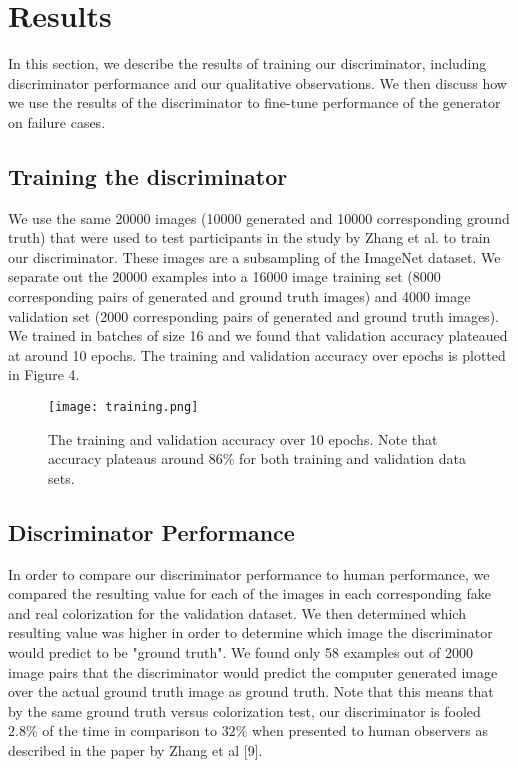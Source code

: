 \documentclass[10pt,twocolumn,letterpaper]{article}
\begin{document}
\section{Results}

In this section, we describe the results of training our discriminator, including discriminator performance and our qualitative observations. We then discuss how we use the results of the discriminator to fine-tune performance of the generator on failure cases. 

\subsection{Training the discriminator}

We use the same 20000 images (10000 generated and 10000 corresponding ground truth) that were used to test participants in the study by Zhang et al. to train our discriminator. These images are a subsampling of the ImageNet dataset. We separate out the 20000 examples into a 16000 image training set (8000 corresponding pairs of generated and ground truth images) and 4000 image validation set (2000 corresponding pairs of generated and ground truth images). We trained in batches of size 16 and we found that validation accuracy plateaued at around 10 epochs. The training and validation accuracy over epochs is plotted in Figure 4. 

\begin{figure}[htp]

\centering
\texttt{[image: training.png]} 
\caption{The training and validation accuracy over 10 epochs. Note that accuracy plateaus around $86\%$ for both training and validation data sets.}

\end{figure}

\subsection{Discriminator Performance}

In order to compare our discriminator performance to human performance, we compared the resulting value for each of the images in each corresponding fake and real colorization for the validation dataset. We then determined which resulting value was higher in order to determine which image the discriminator would predict to be "ground truth". We found only 58 examples out of 2000 image pairs that the discriminator would predict the computer generated image over the actual ground truth image as ground truth. Note that this means that by the same ground truth versus colorization test, our discriminator is fooled $2.8\%$ of the time in comparison to $32\%$ when presented to human observers as described in the paper by Zhang et al [9]. 
\end{document}
